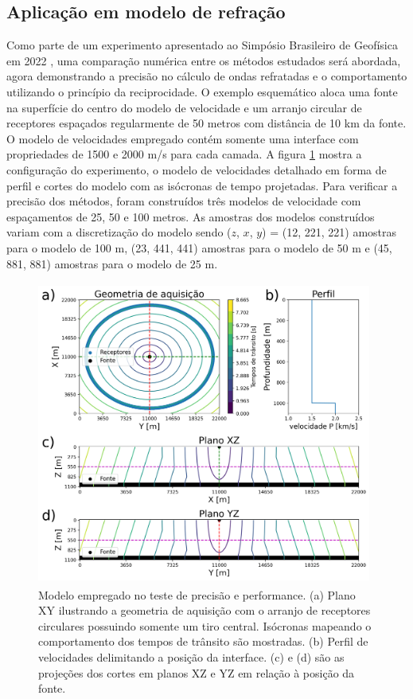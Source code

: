 \subsection{Aplicação em modelo de refração}

Como parte de um experimento apresentado ao Simpósio Brasileiro de Geofísica em 2022 \cite{alves2022refraction}, uma comparação numérica entre os métodos estudados será abordada, agora demonstrando a precisão no cálculo de ondas refratadas e o comportamento utilizando o princípio da reciprocidade. O exemplo esquemático aloca uma fonte na superfície do centro do modelo de velocidade e um arranjo circular de receptores espaçados regularmente de 50 metros com distância de 10 km da fonte. O modelo de velocidades empregado contém somente uma interface com propriedades de 1500 e 2000 m/s para cada camada. A figura \ref{fig:configurationNumericalComparison} mostra a configuração do experimento, o modelo de velocidades detalhado em forma de perfil e cortes do modelo com as isócronas de tempo projetadas. Para verificar a precisão dos métodos, foram construídos três modelos de velocidade com espaçamentos de 25, 50 e 100 metros.  
As amostras dos modelos construídos variam com a discretização do modelo sendo ($z$, $x$, $y$) = (12, 221, 221) amostras para o modelo de 100 m, (23, 441, 441) amostras para o modelo de 50 m e (45, 881, 881) amostras para o modelo de 25 m.

\begin{figure}[H]
	\centering
	\includegraphics[width = 11cm, height = 10cm]{Imgs/RevisaoBibliografica/modelGeometry.png}
	\caption{Modelo empregado no teste de precisão e performance. (a) Plano XY ilustrando a geometria de aquisição com o arranjo de receptores circulares possuindo somente um tiro central. Isócronas mapeando o comportamento dos tempos de trânsito são mostradas. (b) Perfil de velocidades delimitando a posição da interface. (c) e (d) são as projeções dos cortes em planos XZ e YZ em relação à posição da fonte.}
	\label{fig:configurationNumericalComparison}
\end{figure}

